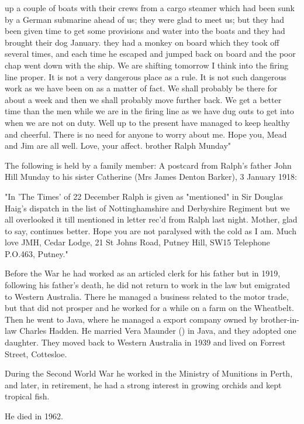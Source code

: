 up a couple of boats with their crews from a cargo steamer which had been sunk by a German submarine ahead of us; they were glad to meet us; but they had been given time to get some provisions and water into the boats and they had brought their dog January. they had a monkey on board which they took off several times, and each time he escaped and jumped back on board and the poor chap went down with the ship.
    We are shifting tomorrow I think into the firing line proper. It is not a very dangerous place as a rule. It is not such dangerous work as we have been on as a matter of fact. We shall probably be there for about a week and then we shall probably move further back. We get a better time than the men while we are in the firing line as we have dug outs to get into when we are not on duty.
    Well up to the present have managed to keep healthy and cheerful. There is no need for anyone to worry about me.
    Hope you, Mead and Jim are all well.
    Love, your affect. brother
    Ralph Munday" 

The following is held by a family member: A postcard from Ralph's father John Hill Munday to his sister Catherine (Mrs James Denton Barker), 3 January 1918:

    "In 'The Times' of 22 December Ralph is given as "mentioned" in Sir Douglas Haig's dispatch in the list of Nottinghamshire and Derbyshire Regiment but we all overlooked it till mentioned in letter rec'd from Ralph last night.
    Mother, glad to say, continues better.
    Hope you are not paralysed with the cold as I am.
    Much love JMH, Cedar Lodge, 21 St Johns Road, Putney Hill, SW15
    Telephone P.O.463, Putney."

Before the War he had worked as an articled clerk for his father but in 1919, following his father's death, he did not return to work in the law but emigrated to Western Australia.  There he managed a business related to the motor trade, but that did not prosper and he worked for a while on a farm on the Wheatbelt. Then he went to Java,  where he managed a export company owned by brother-in-law Charles Hadden.  He married Vera Maunder () in Java,\cite{LadiesSection} and they adopted one daughter.
They  moved back to Western Australia in 1939 and lived on Forrest Street, Cottesloe. 

During the Second World War he worked in the Ministry of Munitions in Perth, and later, in retirement, he had a strong interest in growing orchids and kept tropical fish. 

He died in 1962.\cite{RalphMundayBMD}




  
